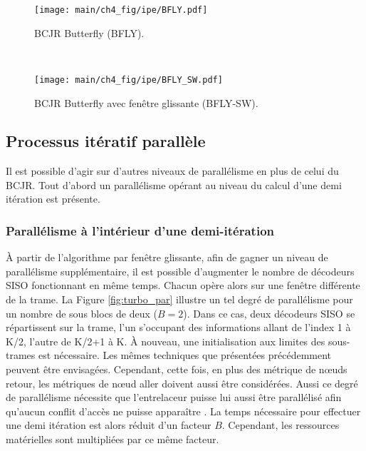 
\begin{figure}[!h]
    \centering
    \begin{minipage}[t]{.49\textwidth}
	\centering
	\texttt{[image: main/ch4\_fig/ipe/BFLY.pdf]}
	\caption{BCJR Butterfly (BFLY). \label{fig:siso_but}}
    \end{minipage}~~~~~~%
    \begin{minipage}[t]{0.49\textwidth}
	\centering
	\texttt{[image: main/ch4\_fig/ipe/BFLY\_SW.pdf]}
	\caption{BCJR Butterfly avec fenêtre glissante (BFLY-SW). \label{fig:siso_bf_sw}}
    \end{minipage}
\end{figure}

\subsection{Processus itératif parallèle}
Il est possible d'agir sur d'autres niveaux de parallélisme en plus de celui du BCJR. Tout d'abord un 
parallélisme opérant au niveau du calcul d'une demi itération est présente.
\subsubsection{Parallélisme à l'intérieur d'une demi-itération}
À partir de l'algorithme par fenêtre glissante, afin de gagner un niveau de parallélisme supplémentaire, il est possible 
d'augmenter le nombre de décodeurs SISO fonctionnant en même temps. Chacun opère alors sur une fenêtre différente de la 
trame. La Figure \ref{fig:turbo_par} illustre un tel degré de parallélisme pour un nombre de sous blocs de deux ($B=2$).
Dans ce cas, deux décodeurs SISO se répartissent sur la trame, l'un s'occupant des informations allant de l'index
1 à K/2, l'autre de K/2+1 à K. À nouveau, une initialisation aux limites des sous-trames est nécessaire. Les mêmes 
techniques que présentées précédemment peuvent être envisagées. Cependant, cette fois, en plus des métrique de nœuds
retour, les métriques de nœud aller doivent aussi être considérées. Aussi ce degré de parallélisme nécessite que 
l'entrelaceur puisse lui aussi être parallélisé afin qu’aucun conflit d'accès ne puisse apparaître 
\cite{interleaver_conflict}. 
La temps nécessaire pour effectuer une demi itération est alors réduit d'un facteur $B$. Cependant, les ressources 
matérielles sont multipliées par ce même facteur.


